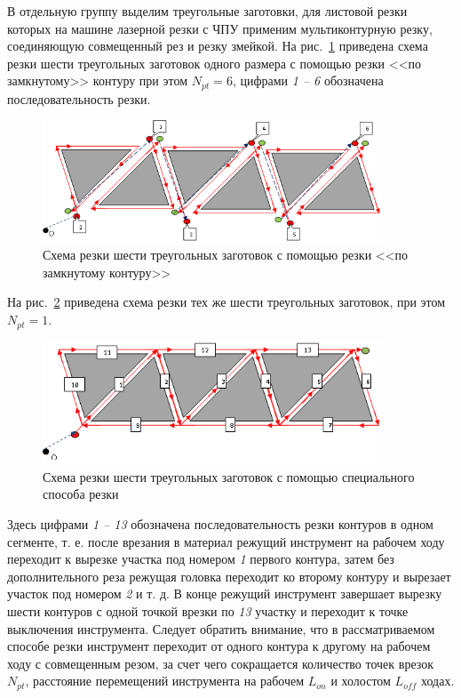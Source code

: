 \documentclass[11pt,twoside,openany]{report}
\begin{document}
В отдельную группу выделим треугольные заготовки,
для листовой резки которых на машине лазерной резки с ЧПУ
применим мультиконтурную резку,
соединяющую совмещенный рез и резку змейкой.
На рис.~\ref{6-6}
приведена схема резки шести треугольных заготовок
одного размера с помощью резки <<по замкнутому>> контуру при этом
$N_{pt}=6$,
цифрами {\it 1 -- 6}
обозначена последовательность резки.

\begin{figure}[h]
  \begin{center}
  \includegraphics[width=0.9\textwidth]{6-6.png}
  \caption{Схема резки шести треугольных заготовок с помощью резки <<по замкнутому контуру>>}
  \label{6-6}
  \end{center}
\end{figure}

На рис.~\ref{6-1} приведена схема резки тех же шести
треугольных заготовок, при этом
$N_{pt}=1$.

\begin{figure}[h]
  \begin{center}
  \includegraphics[width=0.9\textwidth]{6-1.png}
  \caption{Схема резки шести треугольных заготовок с помощью специального способа резки}
  \label{6-1}
  \end{center}
\end{figure}

Здесь цифрами {\it 1 -- 13} обозначена последовательность
резки контуров в одном сегменте,
т. е. после врезания в материал режущий инструмент
на рабочем ходу переходит к вырезке участка под номером {\it 1}
первого контура,
затем без дополнительного реза режущая головка
переходит ко второму контуру и вырезает участок под номером
{\it 2} и т. д.
В конце режущий инструмент завершает вырезку шести контуров
с одной точкой врезки по {\it 13} участку и переходит к
точке выключения инструмента.
Следует обратить внимание, что в рассматриваемом способе
резки инструмент переходит от одного контура к другому
на рабочем ходу с совмещенным резом,
за счет чего сокращается количество точек врезок $N_{pt}$,
расстояние перемещений инструмента на рабочем $L_{on}$
и холостом  $L_{off}$ ходах.
\end{document}
